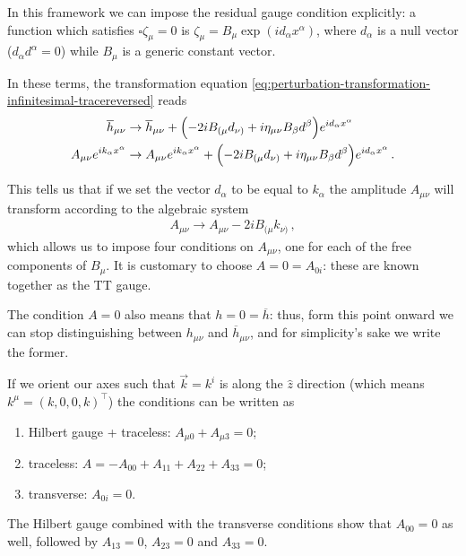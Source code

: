 \documentclass[main.tex]{subfiles}
\begin{document}
In this framework we can impose the residual gauge condition explicitly: a function which satisfies \(\square \zeta_{\mu } = 0\) is \(\zeta_{\mu } = B_{\mu } \exp(i d_\alpha x^{\alpha })\), where \(d_\alpha \) is a null vector (\(d_\alpha d^{\alpha } = 0\)) while \(B_\mu \) is a generic constant vector.

In these terms, the transformation equation \eqref{eq:perturbation-transformation-infinitesimal-tracereversed} reads 
%
\begin{align}
\overline{h}_{\mu \nu } &\to \overline{h}_{\mu \nu } + \qty(- 2 i B_{(\mu } d_{\nu )}  + i \eta_{\mu \nu } B_{\beta } d^{\beta } ) e^{i d_\alpha x^{\alpha }} \\
A_{\mu \nu } e^{i k_\alpha x^{\alpha }} &\to A_{\mu \nu } e^{i k_\alpha x^{\alpha }} + \qty(-2 i B_{(\mu } d_{\nu )} + i \eta_{\mu \nu } B_{\beta } d^{\beta }) e^{i d_\alpha x^{\alpha }} 
\,.
\end{align}

This tells us that if we set the vector \(d_{\alpha }\) to be equal to \(k_\alpha \) the amplitude \(A_{\mu \nu }\) will transform according to the algebraic system
%
\begin{align}
A_{\mu \nu } \to A_{\mu \nu } - 2 i B_{(\mu } k_{\nu )}
\,,
\end{align}
%
which allows us to impose four conditions on \(A_{\mu \nu }\), one for each of the free components of \(B_{\mu }\). 
It is customary to choose \(A = 0 = A_{0 i }\): these are known together as the \ac{TT} gauge. 

The condition \(A = 0\) also means that \(h = 0 = \overline{h}\): thus, form this point onward we can stop distinguishing between \(h_{\mu \nu }\) and  \(\overline{h}_{\mu \nu }\), and for simplicity's sake we write the former. 

If we orient our axes such that \(\vec{k} = k^{i}\) is along the \(\hat{z}\) direction (which means \(k^{\mu } = (k, 0, 0, k)^{\top}\)) the conditions can be written as 
\begin{enumerate}
    \item Hilbert gauge + traceless: \(A_{\mu 0}+ A_{\mu 3} = 0\);
    \item traceless: \(A = - A_{00} + A_{11} + A_{22} + A_{33} = 0 \);
    \item transverse: \(A_{0i} = 0\). 
\end{enumerate}

The Hilbert gauge combined with the transverse conditions show that \(A_{00} = 0\) as well, followed by \(A_{13} = 0\), \(A_{23} = 0\) and \(A_{33} = 0\). 
\end{document}
